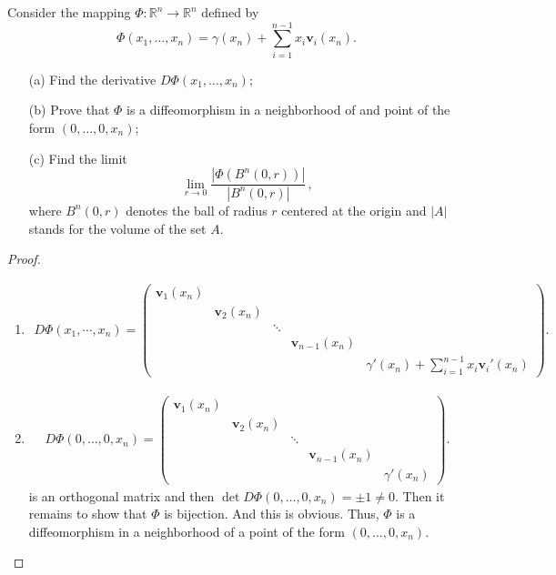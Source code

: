 \documentclass[12pt,leqno]{amsart}
\theoremstyle{definition}
\begin{document}
Consider the mapping $\Phi:\mathbb{R}^n\to\mathbb{R}^n$ defined by
$$
\Phi(x_1,\ldots,x_n)=\gamma(x_n)+\sum_{i=1}^{n-1} x_i\mathbf{v}_i(x_n).
$$
\begin{itemize}
	\item[(a)] Find the derivative $D\Phi(x_1,\ldots,x_n)$;
	\item[(b)] Prove that $\Phi$ is a diffeomorphism in a neighborhood of and point of the form $(0,\ldots,0,x_n)$;
	\item[(c)] Find the limit
	$$
	\lim_{r\to 0}
	\frac{|\Phi(B^n(0,r))|}{|B^n(0,r)|}\, ,
	$$
	where $B^n(0,r)$ denotes the ball of radius $r$ centered at the origin and $|A|$ stands for the volume of the set $A$.
\end{itemize}
\begin{proof}
~\begin{enumerate}[label=(\alph*)]
    \item 
    \begin{align*}
        D\Phi(x_1,\cdots,x_n) = \begin{pmatrix}
            \mathbf{v}_1(x_n) &  &  &  &  \\
            & \mathbf{v}_2(x_n) &  &  &  \\
            &  & \ddots &  & \\
            &  &  & \mathbf{v}_{n-1}(x_n) \\
            &  &  &  & \gamma'(x_n) + \sum^{n-1}_{i=1}x_i \mathbf{v}_i'(x_n)
        \end{pmatrix}.
    \end{align*}
    
    \item 
    \begin{align*}
        D\Phi(0,\ldots, 0, x_n) = \begin{pmatrix}
            \mathbf{v}_1(x_n) &  &  &  &  \\
            & \mathbf{v}_2(x_n) &  &  &  \\
            &  & \ddots &  & \\
            &  &  & \mathbf{v}_{n-1}(x_n) \\
            &  &  &  & \gamma'(x_n)
        \end{pmatrix}.
    \end{align*}
    is an orthogonal matrix and then $\det D\Phi(0,\ldots, 0, x_n) = \pm 1 \neq 0$. Then it remains to show that $\Phi$ is bijection. And this is obvious. Thus, $\Phi$ is a diffeomorphism in a neighborhood of a point of the form $(0,\ldots,0,x_n)$.
    

\end{enumerate}
\end{proof}
\end{document}
